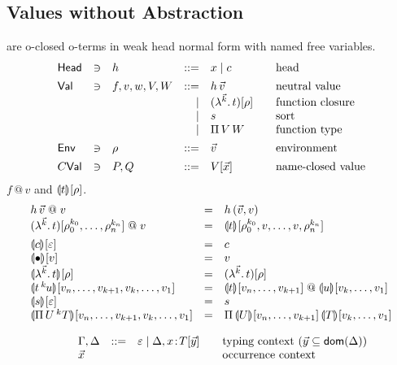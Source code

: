 \documentclass[a4paper]{article}
\makeatletter
\newcommand{\oann}[1]{{}^{#1}\kern-0.15ex}
\newcommand{\ovar}{\mathord{\bullet}}
\newcommand{\oapp}[1]{\,\oann{#1}}
\newcommand{\olam}[1]{\lambda^{#1}.\,}
\newcommand{\opi}[2]{\Pi\,#1\,^{#2}}
\renewcommand{\esubst}[2]{#1[#2]}
\renewcommand{\cempty}{\varepsilon}
\renewcommand{\sempty}{\varepsilon}
\newcommand{\oclos}[2]{#1[#2]}
\newcommand{\Head}{\mathsf{Head}}
\newcommand{\appa}{\mathrel{@}}
\renewcommand{\eval}[2]{\dent{#1}{}[#2]}
\makeatother
\begin{document}
\subsection{Values without Abstraction}

 are o-closed o-terms in weak head normal form with named
free variables.
\[
\begin{array}{lllrl@{\qquad}l}
\Head & \ni & h & ::= &  x \mid c & \mbox{head} \\[1ex]
\Val & \ni & f,v,w,V,W & ::= & h \, {\vec v} & \mbox{neutral
  value} \\
&&& \mid & \esubst{(\olam {\vec k} t)}{\rho} & \mbox{function closure} \\
&&& \mid & s & \mbox{sort} \\
&&& \mid & \piT V  W & \mbox{function type} \\[1ex]
\Env & \ni & \rho & ::= & \vec v & \mbox{environment} \\[1ex]
C\Val& \ni & P,Q & ::= & \esubst V {\vec x} & \mbox{name-closed value} \\
\end{array}
\]
 $f \appa v$ and $\eval t \rho$.
\[
\begin{array}{lll}
  h \,{\vec v} \appa v
    & = & h \, {(\vec v,v)} \\
  \esubst{(\olam {\vec k} t)}{\rho_0^{k_0},\dots,\rho_n^{k_n}} \appa v
    & = & \eval t
    {\rho_0^{k_0},v,\dots,v,\rho_n^{k_n}}
\\[1ex]
  \eval c {\sempty} & = & c \\
  \eval \ovar {v} & = & v \\
  \eval {\olam{\vec k}t} \rho & = & \esubst {(\olam{\vec k}t)} \rho
  \\
  \eval {t \oapp k u} {v_n,\dots,v_{k+1},
                       v_k,\dots,v_1}
    & = & \eval t {v_n,\dots,v_{k+1}} \appa \eval u {v_k,\dots,v_1}
\\
  \eval s \sempty & = & s \\
  \eval {\opi U k T} {v_n,\dots,v_{k+1},
                      v_k,\dots,v_1}
    & = & \piT {\eval U {v_n,\dots,v_{k+1}}} {\eval T {v_k,\dots,v_1}}
\\
\end{array}
\]

\[
\begin{array}{lllrl@{\qquad}l}
&& \Gamma,\Delta & ::= & \cempty \mid \Delta, x \of \oclos{T}{\vec y}
  & \mbox{typing context } (\vec y \subseteq \dom(\Delta))
\\
&& \vec x &&& \mbox{occurrence context} \\
\end{array}
\]
\end{document}
